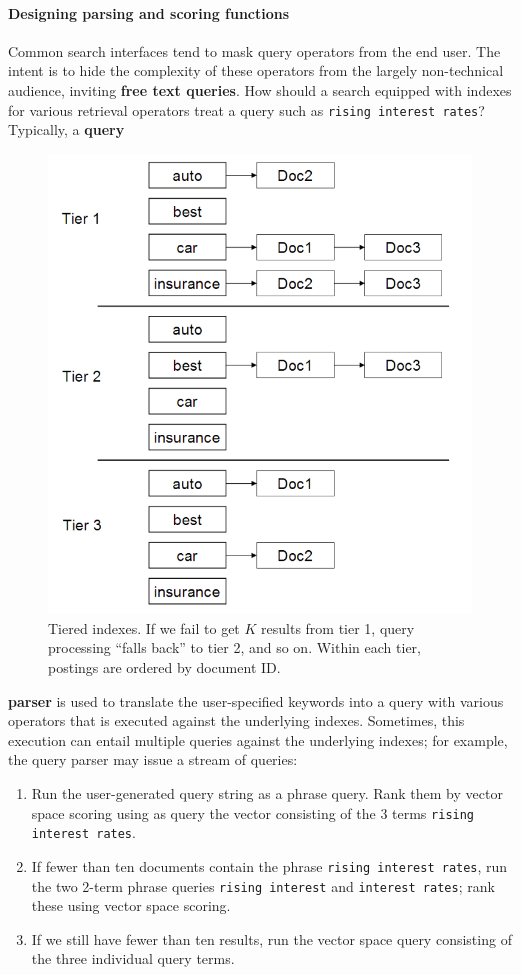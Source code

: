 \documentclass[letterpaper,11pt]{article}
\newcommand{\code}[1]{\texttt{#1}}
\begin{document}
\paragraph{Designing parsing and scoring functions}
Common search interfaces tend to mask query operators from the end user. The intent is to hide the complexity of these operators from the largely non-technical audience, inviting \textbf{free text queries}. How should a search equipped with indexes for various retrieval operators treat a query such as \code{rising interest rates}? Typically, a \textbf{query}
\begin{figure}[H]
    \centering
    \includegraphics[scale=0.60]{sect7/figure_7_4.png}
    \caption{Tiered indexes. If we fail to get $K$ results from tier 1, query processing
“falls back” to tier 2, and so on. Within each tier, postings are ordered by document ID.}
\end{figure}
\noindent
\textbf{parser} is used to translate the user-specified keywords into a query with various operators that is executed against the underlying indexes. Sometimes, this execution can entail multiple queries against the underlying indexes; for example, the query parser may issue a stream of queries:
\begin{enumerate}
    \item Run the user-generated query string as a phrase query. Rank them by vector space scoring using as query the vector consisting of the 3 terms \code{rising interest rates}.
    \item If fewer than ten documents contain the phrase \code{rising interest rates}, run the two 2-term phrase queries \code{rising interest} and \code{interest rates}; rank these using vector space scoring.
    \item If we still have fewer than ten results, run the vector space query consisting of the three individual query terms.
\end{enumerate}
\end{document}
